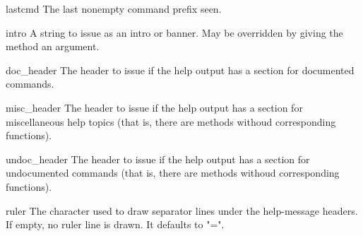 \begin{memberdesc}{lastcmd}
The last nonempty command prefix seen. 
\end{memberdesc}

\begin{memberdesc}{intro}
A string to issue as an intro or banner.  May be overridden by giving
the  method an argument.
\end{memberdesc}

\begin{memberdesc}{doc_header}
The header to issue if the help output has a section for documented commands.
\end{memberdesc}

\begin{memberdesc}{misc_header}
The header to issue if the help output has a section for miscellaneous
help topics (that is, there are  methods withoud corresponding
 functions).
\end{memberdesc}

\begin{memberdesc}{undoc_header}
The header to issue if the help output has a section for undocumented 
commands (that is, there are  methods withoud corresponding
 functions).
\end{memberdesc}

\begin{memberdesc}{ruler}
The character used to draw separator lines under the help-message
headers.  If empty, no ruler line is drawn.  It defaults to "=".
\end{memberdesc}


